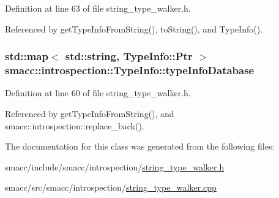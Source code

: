 Definition at line 63 of file string\+\_\+type\+\_\+walker.\+h.



Referenced by get\+Type\+Info\+From\+String(), to\+String(), and Type\+Info().

\subsubsection[{\texorpdfstring{type\+Info\+Database}{typeInfoDatabase}}]{\setlength{\rightskip}{0pt plus 5cm}std\+::map$<$ std\+::string, {\bf Type\+Info\+::\+Ptr} $>$ smacc\+::introspection\+::\+Type\+Info\+::type\+Info\+Database\hspace{0.3cm}{\ttfamily [static]}}\hypertarget{classsmacc_1_1introspection_1_1TypeInfo_ab780c03206b824aaf338135d16b0eff4}{}\label{classsmacc_1_1introspection_1_1TypeInfo_ab780c03206b824aaf338135d16b0eff4}


Definition at line 60 of file string\+\_\+type\+\_\+walker.\+h.



Referenced by get\+Type\+Info\+From\+String(), and smacc\+::introspection\+::replace\+\_\+back().



The documentation for this class was generated from the following files\+:\begin{DoxyCompactItemize}
\item 
smacc/include/smacc/introspection/\hyperlink{string__type__walker_8h}{string\+\_\+type\+\_\+walker.\+h}\item 
smacc/src/smacc/introspection/\hyperlink{string__type__walker_8cpp}{string\+\_\+type\+\_\+walker.\+cpp}\end{DoxyCompactItemize}
